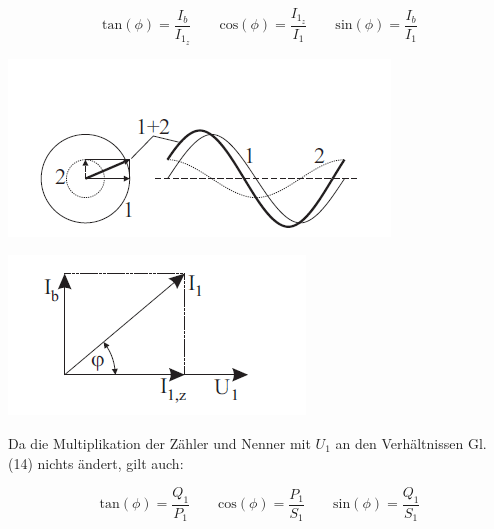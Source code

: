 \documentclass[11pt,ngerman]{scrartcl}
\begin{document}
\begin{equation}
	\textrm{tan}(\phi) = \frac{I_b}{I_{1_z}} \qquad \textrm{cos}(\phi) = \frac{I_{1_z}}{I_1} \qquad \textrm{sin}(\phi) = \frac{I_b}{I_1}
\end{equation}

\begin{minipage}{\textwidth}
	\begin{minipage}[t]{0.6\textwidth}
		\centering
		\includegraphics[width=\textwidth]{abb6}
		\label{fig:abb6}
	\end{minipage}
	\vspace{2mm}
	\begin{minipage}[t]{0.4\textwidth}
		\centering
		\includegraphics[width=\textwidth]{abb7}
		\label{fig:abb7}
	\end{minipage}
	\vspace{1em}
\end{minipage}

Da die Multiplikation der Zähler und Nenner mit $U_1$ an den Verhältnissen Gl. (14) nichts ändert,
gilt auch:

\begin{equation}
	\textrm{tan}(\phi) = \frac{Q_1}{P_1} \qquad \textrm{cos}(\phi) = \frac{P_1}{S_1} \qquad \textrm{sin}(\phi) = \frac{Q_1}{S_1}
\end{equation}
\end{document}
